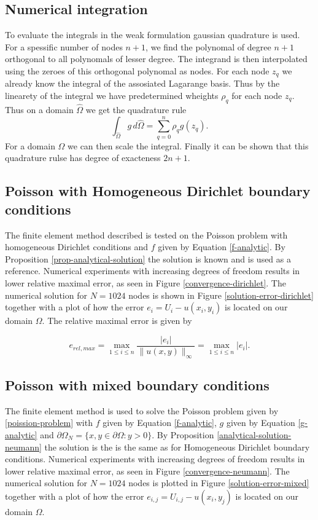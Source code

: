 \documentclass[5pt,a4paper,english]{elsarticle}%
\begin{document}
\subsection{Numerical integration}
To evaluate the integrals in the weak formulation gaussian quadrature is used. For a spessific number of nodes $n+1$, we find the polynomal of degree $n+1$ orthogonal to all polynomals of lesser degree. The integrand is then interpolated using the zeroes of this orthogonal polynomal as nodes. For each node $z_q$ we already know the integral of the assosiated Lagarange basis. Thus by the linearety of the integral we have predetermined wheights $\rho_q$  for each node $z_q$. Thus on a domain $\hat{\Omega}$ we get the quadrature rule
\begin{equation}
    \int_{\hat{\Omega}} g \, d\hat{\Omega} = \sum_{q=0}^{n}{\rho_q g(z_q)}.
\end{equation}
For a domain $\Omega$ we can then scale the integral. Finally it can be shown that this quadrature rulse has degree of exacteness $2n+1$.


\subsection{Poisson with Homogeneous Dirichlet boundary conditions}
The finite element method described is tested on the Poisson problem with homogeneous Dirichlet conditions and $f$ given by Equation \eqref{f-analytic}. 
By Proposition \ref{prop-analytical-solution} the solution is known and is used as a reference. 
Numerical experiments with increasing degrees of freedom results in lower relative maximal error, as seen in Figure \ref{convergence-dirichlet}. The numerical solution for $N = 1024$ nodes is shown in Figure \ref{solution-error-dirichlet}
together with a plot of how the error $e_{i} = U_{i} - u(x_i,y_i)$ is located on our domain $\Omega$. 
The relative maximal error is given by

\begin{equation*}
    e_{rel,max} = \max_{1\leq i \leq n} \frac{|e_i|}{\| u(x,y)\|_{\infty}} = \max_{1\leq i \leq n} |e_i|.
\end{equation*}

\subsection{Poisson with mixed boundary conditions}
The finite element method is used to solve the Poisson problem given by \eqref{poission-problem} with $f$ given by Equation \eqref{f-analytic}, $g$ given by Equation \eqref{g-analytic} and $\partial \Omega_N = \{ x,y \in \partial \Omega : y> 0\}$. By Proposition \ref{analytical-solution-neumann} the solution is the is the same as for Homogeneous Dirichlet boundary conditions. Numerical experiments with increasing degrees of freedom results in lower relative maximal error, as seen in Figure \ref{convergence-neumann}. The numerical solution for $N = 1024$ nodes is plotted in Figure \ref{solution-error-mixed} together with a plot of how the error $e_{i,j} = U_{i,j} - u(x_i,y_j)$ is located on our domain $\Omega$. 
\end{document}
